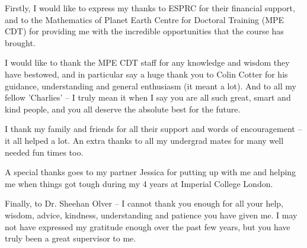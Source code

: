 
\cleardoublepage


\begin{acknowledgements}

Firstly, I would like to express my thanks to ESPRC for their financial support, and to the Mathematics of Planet Earth Centre for Doctoral Training (MPE CDT) for providing me with the incredible opportunities that the course has brought. 

I would like to thank the MPE CDT staff for any knowledge and wisdom they have bestowed, and in particular say a huge thank you to Colin Cotter for his guidance, understanding and general enthusiasm (it meant a lot). And to all my fellow 'Charlies' -- I truly mean it when I say you are all such great, smart and kind people, and you all deserve the absolute best for the future.

I thank my family and friends for all their support and words of encouragement -- it all helped a lot. An extra thanks to all my undergrad mates for many well needed fun times too.

A special thanks goes to my partner Jessica for putting up with me and helping me when things got tough during my 4 years at Imperial College London. 

Finally, to Dr. Sheehan Olver -- I cannot thank you enough for all your help, wisdom, advice, kindness, understanding and patience you have given me. I may not have expressed my gratitude enough over the past few years, but you have truly been a great supervisor to me.


%

\end{acknowledgements}
